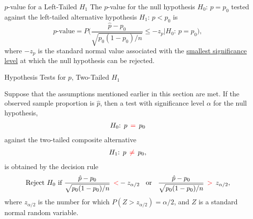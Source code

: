 \documentclass[pdf]{beamer}
\theoremstyle{remark}
\theoremstyle{definition}
\begin{document}
\begin{frame}[t]{$p$-value for a Left-Tailed $H_1$}
The $p$-value for the null hypothesis $H_0\text{: }  p = p_0$ tested against the left-tailed alternative hypothesis $H_1\text{: }  p < p_0$ is
\begin{equation}
p\text{-value} = P\bigg( \frac{\hat{p} - p_0}{\sqrt{p_0(1-p_0)/ n}} \leq -z_{p} | H_0\text{: }  p = p_0 \bigg),
\end{equation}
where $-z_p$ is the standard normal value associated with the \underline{smallest significance level} at which the null hypothesis can be rejected.
\end{frame}

\begin{frame}[t,label=pTT]{Hypothesis Tests for $p$, Two-Tailed $H_1$}
\small
\begin{tcolorbox}[colback=white!5,colframe=franklinblue]%
Suppose that the assumptions mentioned earlier in this section are met. If the observed sample proportion is $\hat{p}$, then a test with significance level $\alpha$ for the null hypothesis, 
\vspace{-1.0ex}
\begin{align*} 
H_0\text{: }  p \;\, \textcolor{red}{=} \;\, p_0  
\end{align*} 
\vspace{-1.0ex}
against the two-tailed composite alternative 
\vspace{0.0ex}
\begin{align*} 
H_1\text{: }  p \;\, \textcolor{red}{\neq} \;\, p_0, 
\end{align*} 
\vspace{-1.0ex}
is obtained by the decision rule 
\vspace{0.0ex}
\begin{equation} 
\text{Reject } H_0 \text{ if } \frac{\hat{p} - p_0}{\sqrt{p_0(1-p_0)/ n}} \;\, \textcolor{red}{<} -z_{\alpha/2} \;\; \text{ or } \;\;
\frac{\hat{p} - p_0}{\sqrt{p_0(1-p_0)/ n}} \;\, \textcolor{red}{>} \;\, z_{\alpha/2},
\end{equation} 
where $z_{\alpha/2}$ is the number for which $P(Z > z_{\alpha/2}) = \alpha/2$, and $Z$ is a standard normal random variable. 
\end{tcolorbox}
\end{frame}
\end{document}
